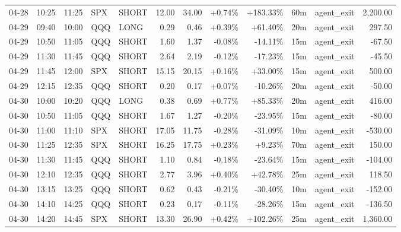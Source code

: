 \documentclass[11pt,a4paper]{article}
\begin{document}
\begin{center}
\begin{longtable}{>{\color{txtmain}}l l l l l r r r r r >{\color{txtmain}}l r}
04-28 & 10:25 & 11:25 & SPX & SHORT & 12.00 & 34.00 & \textcolor{wingreen}{+0.74\%} & \textcolor{wingreen}{+183.33\%} & 60m & agent\_exit & \textcolor{wingreen}{2,200.00} \\
04-29 & 09:40 & 10:00 & QQQ & LONG & 0.29 & 0.46 & \textcolor{wingreen}{+0.39\%} & \textcolor{wingreen}{+61.40\%} & 20m & agent\_exit & \textcolor{wingreen}{297.50} \\
04-29 & 10:50 & 11:05 & QQQ & SHORT & 1.60 & 1.37 & \textcolor{lossred}{-0.08\%} & \textcolor{lossred}{-14.11\%} & 15m & agent\_exit & \textcolor{lossred}{-67.50} \\
04-29 & 11:30 & 11:45 & QQQ & SHORT & 2.64 & 2.19 & \textcolor{lossred}{-0.12\%} & \textcolor{lossred}{-17.23\%} & 15m & agent\_exit & \textcolor{lossred}{-45.50} \\
04-29 & 11:45 & 12:00 & SPX & SHORT & 15.15 & 20.15 & \textcolor{wingreen}{+0.16\%} & \textcolor{wingreen}{+33.00\%} & 15m & agent\_exit & \textcolor{wingreen}{500.00} \\
04-29 & 12:15 & 12:35 & QQQ & SHORT & 0.20 & 0.17 & \textcolor{wingreen}{+0.07\%} & \textcolor{lossred}{-10.26\%} & 20m & agent\_exit & \textcolor{lossred}{-50.00} \\
04-30 & 10:00 & 10:20 & QQQ & LONG & 0.38 & 0.69 & \textcolor{wingreen}{+0.77\%} & \textcolor{wingreen}{+85.33\%} & 20m & agent\_exit & \textcolor{wingreen}{416.00} \\
04-30 & 10:50 & 11:05 & QQQ & SHORT & 1.67 & 1.27 & \textcolor{lossred}{-0.20\%} & \textcolor{lossred}{-23.95\%} & 15m & agent\_exit & \textcolor{lossred}{-80.00} \\
04-30 & 11:00 & 11:10 & SPX & SHORT & 17.05 & 11.75 & \textcolor{lossred}{-0.28\%} & \textcolor{lossred}{-31.09\%} & 10m & agent\_exit & \textcolor{lossred}{-530.00} \\
04-30 & 11:25 & 12:35 & SPX & SHORT & 16.25 & 17.75 & \textcolor{wingreen}{+0.23\%} & \textcolor{wingreen}{+9.23\%} & 70m & agent\_exit & \textcolor{wingreen}{150.00} \\
04-30 & 11:30 & 11:45 & QQQ & SHORT & 1.10 & 0.84 & \textcolor{lossred}{-0.18\%} & \textcolor{lossred}{-23.64\%} & 15m & agent\_exit & \textcolor{lossred}{-104.00} \\
04-30 & 12:10 & 12:35 & QQQ & SHORT & 2.77 & 3.96 & \textcolor{wingreen}{+0.40\%} & \textcolor{wingreen}{+42.78\%} & 25m & agent\_exit & \textcolor{wingreen}{118.50} \\
04-30 & 13:15 & 13:25 & QQQ & SHORT & 0.62 & 0.43 & \textcolor{lossred}{-0.21\%} & \textcolor{lossred}{-30.40\%} & 10m & agent\_exit & \textcolor{lossred}{-152.00} \\
04-30 & 14:10 & 14:25 & QQQ & SHORT & 0.23 & 0.17 & \textcolor{lossred}{-0.11\%} & \textcolor{lossred}{-28.26\%} & 15m & agent\_exit & \textcolor{lossred}{-136.50} \\
04-30 & 14:20 & 14:45 & SPX & SHORT & 13.30 & 26.90 & \textcolor{wingreen}{+0.42\%} & \textcolor{wingreen}{+102.26\%} & 25m & agent\_exit & \textcolor{wingreen}{1,360.00} \\
\end{longtable}
\end{center}
\clearpage
\end{document}
